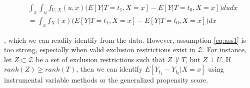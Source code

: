 \documentclass{article}
\begin{document}
	\begin{align}
		& \int_x\int_uf_{U,X}(u,x)\bigg(E[Y|T=t_1,X=x]-E[Y|T=t_0,X=x]\bigg)dudx \\ \nonumber
		& = \int_xf_{X}(x)\bigg(E[Y|T=t_1,X=x]-E[Y|T=t_0,X=x]\bigg)dx
	\end{align}
	
	\noindent , which we can readily identify from the data. However, assumption \ref{eq:ass1}
	is too strong, especially when valid exclusion restrictions exist in $\mathcal{Z}$. 
	For instance, let $Z \subset \mathcal{Z}$ be a set of exclusion restrictions such that
	$Z \not\perp T$, but $Z \perp U$. If $rank(Z) \geq rank(T)$, then we can identify
	$E[Y_{t_1}-Y_{t_0}|X=x]$ using instrumental variable methods or the generalized
	propensity score.
\end{document}
